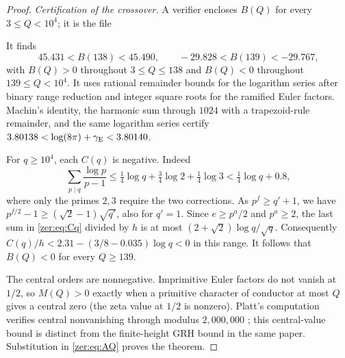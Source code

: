\begin{proof}
\emph{Certification of the crossover.} A verifier encloses $B(Q)$ for every
$3\le Q<10^4$; it is the file
\begin{center}
\end{center}
It finds
\[
 45.431<B(138)<45.490,\qquad-29.828<B(139)<-29.767,
\]
with $B(Q)>0$ throughout $3\le Q\le138$ and $B(Q)<0$ throughout $139\le Q<10^4$. It uses
rational remainder bounds for the logarithm series after binary range reduction and integer
square roots for the ramified Euler factors. Machin's identity, the harmonic sum through
$1024$ with a trapezoid-rule remainder, and the same logarithm series certify
$3.80138<\log(8\pi)+\gamma_{\mathrm{E}}<3.80140$.

For $q\ge10^4$, each $C(q)$ is negative. Indeed
\[
 \sum_{p\mid q}\frac{\log p}{p-1}\le\tfrac14\log q+\tfrac34\log2+\tfrac14\log3
 <\tfrac14\log q+0.8,
\]
where only the primes $2,3$ require the two corrections. As $p^f\ge q'+1$, we have
$p^{f/2}-1\ge(\sqrt2-1)\sqrt{q'}$, also for $q'=1$. Since $e\ge p^a/2$ and $p^a\ge2$, the
last sum in \eqref{zer:eq:Cq} divided by $h$ is at most $(2+\sqrt2)\log q/\sqrt q$.
Consequently $C(q)/h<2.31-(3/8-0.035)\log q<0$ in this range. It follows that $B(Q)<0$
for every $Q\ge139$.

The central orders are nonnegative. Imprimitive Euler factors do not vanish at $1/2$, so
$M(Q)>0$ exactly when a primitive character of conductor at most $Q$ gives a central zero
(the zeta value at $1/2$ is nonzero). Platt's computation verifies central nonvanishing
through modulus $2{,}000{,}000$ \cite[Theorem~9.2 of the author manuscript]{Platt2016Numerical};
this central-value bound is distinct from the finite-height GRH bound in the same paper. Substitution in
\eqref{zer:eq:AQ} proves the theorem.
\end{proof}

